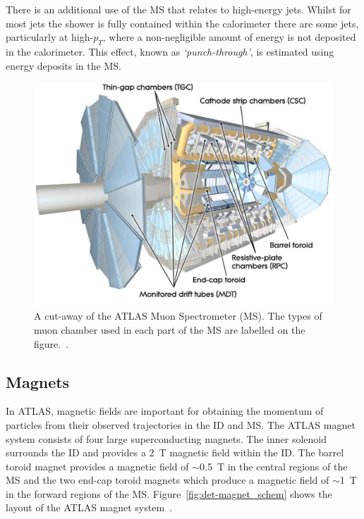 There is an additional use of the MS that relates to high-energy jets.
Whilst for most jets the shower is fully contained within the calorimeter
there are some jets, particularly at high-$p_T$, where a non-negligible amount of energy is not deposited in the calorimeter.
This effect, known as \textit{`punch-through'}, is estimated using energy deposits in the MS.

\begin{figure}[!htb]
  \begin{center}
    \includegraphics[width=0.8\linewidth, angle=0]{figs/Detector/MS_schem.pdf}
  \end{center}
  \caption[A cut-away of the ATLAS Muon Spectrometer.]
          {A cut-away of the ATLAS Muon Spectrometer (MS). The types of muon chamber used in each part of the MS are labelled on the figure.~\cite{det-ATLAS_Exp}.}
  \label{fig:det-ms_schem}
\end{figure}

\newpage

\subsection{Magnets}
\label{sec:det-magnets}

In ATLAS, magnetic fields are important for obtaining the momentum of particles from their observed trajectories in the ID and MS.
The ATLAS magnet system consists of four large superconducting magnets.
The inner solenoid surrounds the ID and provides a 2~T magnetic field within the ID.
The barrel toroid magnet provides a magnetic field of $\sim$0.5~T in the central regions of the MS and
the two end-cap toroid magnets which produce a magnetic field of $\sim$1~T in the forward regions of the MS.
Figure~\ref{fig:det-magnet_schem} shows the layout of the ATLAS magnet system~\cite{det-magnet_fig}.

